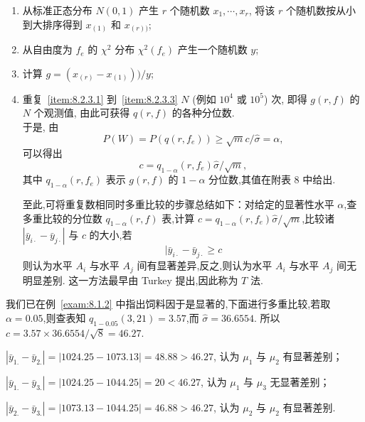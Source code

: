 \begin{enumerate}[label=\color{structurecolor}(\arabic*)]
  \item 从标准正态分布 $N(0,1)$ 产生 $r$ 个随机数 $x_1,\cdots, x_r$, 将该 $r$ 个随机数按从小到大排序得到 $x_{(1)}$ 和 $x_{(r))}$; \label{item:8.2.3.1}
  \item 从自由度为 $f_e$ 的 $\chi^2$ 分布 $\chi^2(f_e)$ 产生一个随机数 $y$; \label{item:8.2.3.2}
  \item 计算 $g =(x_{(r)}-x_{(1)}))/y$; \label{item:8.2.3.3}
  \item 重复~\ref{item:8.2.3.1} 到~\ref{item:8.2.3.3} $N$ (例如 $10^4$ 或 $10^5$) 次, 即得 $g(r,f)$ 的 $N$ 个观测值, 由此可获得 $q(r,f)$ 的各种分位数.\\
  于是, 由
  \begin{equation}\label{eq:8.2.3}
    P(W) = P(q(r,f_e)) \geq \sqrt{m} c/\hat{\sigma} = \alpha,
  \end{equation}
  可以得出
  \begin{equation}\label{eq:8.2.4}
    c = q_{1-\alpha}(r,f_e) \hat{\sigma}/\sqrt{m},
  \end{equation}
  其中 $q_{1-\alpha}(r,f_e)$ 表示 $g(r,f)$ 的 $1-\alpha$ 分位数,其值在附表 8 中给出.

至此,可将重复数相同时多重比较的步骤总结如下：对给定的显著性水平 $\alpha$,查多重比较的分位数 $q_{1-\alpha}(r,f)$ 表,计算 $c = q_{1-\alpha}(r,f_e)\hat{\sigma}/\sqrt{m}$,比较诸 $|\bar{y}_{i\cdot} - \bar{y}_{j\cdot}|$ 与 $c$ 的大小,若
\begin{equation*}
  |\bar{y}_{i\cdot} - \bar{y}_{j\cdot} \geq c
\end{equation*}
则认为水平 $A_i$ 与水平 $A_j$ 间有显著差异,反之,则认为水平 $A_i$ 与水平 $A_j$ 间无明显差别. 这一方法最早由 Turkey 提出,因此称为 $T$ 法.
\end{enumerate}

\begin{example}
  我们已在例~\ref{exam:8.1.2} 中指出饲料因于是显著的,下面进行多重比较,若取 $\alpha=0.05$,则查表知 $q_{1-0.05}(3,21)=3.57$,而 $\hat{\sigma} = 36.6554$. 所以 $c = 3.57 \times 36.6554/\sqrt{8} = 46.27$.
\end{example}

$\left|\bar{y}_{1.}-\bar{y}_{2.}\right|=|1024.25-1073.13|=48.88>46.27$, 认为 $\mu_1$ 与 $\mu_2$ 有显著差别；

$\left|\bar{y}_{1.}-\bar{y}_{3.}\right|=|1024.25-1044.25|=20<46.27$, 认为 $\mu_1$ 与 $\mu_3$ 无显著差别；

$\left|\bar{y}_{2.}-\bar{y}_{3.}\right|=|1073.13-1044.25|=46.88>46.27$, 认为 $\mu_2$ 与 $\mu_2$ 有显著差别.

